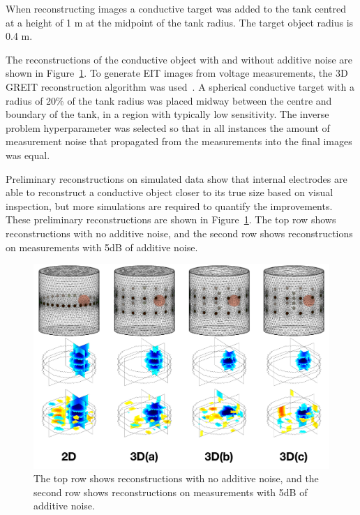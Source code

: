 When reconstructing images a conductive target was added to the tank
centred at a height of 1 m at the midpoint of the tank radius. The target
object radius is 0.4 m.

The reconstructions of the conductive object with and without additive noise are shown in Figure~\ref{fig:reconstruction_comparison}.
To generate EIT images from voltage measurements, the 3D GREIT
reconstruction algorithm
was used~\parencite{Adler2009}. A spherical
conductive target with a radius of 20\% of the tank radius
was placed midway between the centre and boundary
of the tank, in a region with typically low sensitivity.
The inverse problem hyperparameter
was selected so that in all instances the amount of measurement
noise that propagated from the measurements into the final images
was equal.

Preliminary reconstructions on simulated data show that internal electrodes are able to reconstruct a conductive object closer to its true 
size based on visual inspection, but more simulations are required to quantify the improvements. These preliminary reconstructions are shown in
Figure~\ref{fig:reconstruction_comparison}. The top row shows reconstructions with no additive noise, and the second row shows reconstructions on measurements with 5dB of 
additive noise.

\begin{figure}
\centering
\includegraphics[width=\textwidth]{chapter6-internal_electrodes/imgs/Image_Comparison.pdf}
\caption[Internal electrode simulation reconstructions]{The top row shows reconstructions with no additive noise, and the second row shows reconstructions on measurements with 5dB of
additive noise.}
\label{fig:reconstruction_comparison}
\end{figure}

